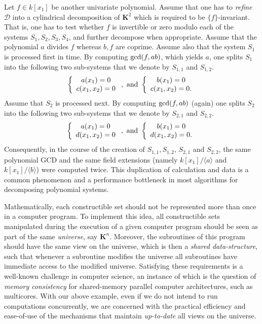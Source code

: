 \documentclass[10pt]{article}
\def\KK {\ensuremath{\mathbf{K}}}
\def\DD {\ensuremath{\mathcal{D}}}
\begin{document}
Let $f \in k[x_1]$ be another univariate polynomial.
Assume that one has to {\em refine} ${\DD}$ into a cylindrical decomposition
of ${\KK}^2$ which is required to be $\{ f \}$-invariant.
That is, one has to test whether $f$ is invertible or zero
modulo each of the systems $S_1, S_2, S_3, S_4$,
and further decompose when appropriate.
Assume that the polynomial 
$a$ divides $f$ whereas $b, f$ are coprime.
Assume also that the system $S_1$ is processed first in time.
By computing ${\rm gcd}(f,ab)$, which yields $a$, 
one splits $S_1$ into the following two
sub-systems that we denote by $S_{1,1}$ and $S_{1,2}$.
\begin{equation*}
\left\{
\begin{array}{c}
a(x_1) = 0 \\
c(x_1, x_2) = 0
\end{array}
\right., \  {\rm and} \ 
\left\{
\begin{array}{c}
b(x_1) = 0 \\
c(x_1, x_2) = 0.
\end{array}
\right.
\end{equation*}
Assume that $S_2$ is processed next.
By computing ${\rm gcd}(f,ab)$ (again) 
one splits $S_2$ into the following two
sub-systems that we denote by $S_{2,1}$ and $S_{2,2}$.
\begin{equation*}
\left\{
\begin{array}{c}
a(x_1) = 0 \\
d(x_1, x_2) = 0
\end{array}
\right., \  {\rm and} \ 
\left\{
\begin{array}{c}
b(x_1) = 0 \\
d(x_1, x_2) = 0.
\end{array}
\right.
\end{equation*}
Consequently, in the course of the creation 
of $S_{1,1}, S_{1,2}$, $S_{2,1}$ and $S_{2,2}$,
the same polynomial GCD  and the same 
field extensions (namely $k[x_1] / \langle a \rangle$
and $k[x_1] / \langle b \rangle$) were computed twice.
This duplication of calculation and data is a common
phenomenon and a performance bottleneck in most
algorithms for decomposing polynomial systems.

Mathematically, each constructible set should not be
represented more than once in a computer program.
To implement this idea, all constructible sets
manipulated during the execution of a given computer 
program should be seen as part of the same {\em universe},
say ${\KK}^n$. Moreover, the subroutines of this program
should have the same view on the universe, which is then
a {\em shared data-structure}, such that whenever a
subroutine modifies the universe all subroutines
have immediate access to the modified universe.
Satisfying these requirements is a well-known 
challenge in computer science, an instance of which
is the question of {\em memory consistency}
for shared-memory parallel computer architectures,
such as multicores. With our above example, even if 
we do not intend to run computations concurrently,
we are concerned with the practical efficiency
and ease-of-use of the mechanisms that maintain {\em up-to-date}
all views on the universe.
\end{document}

